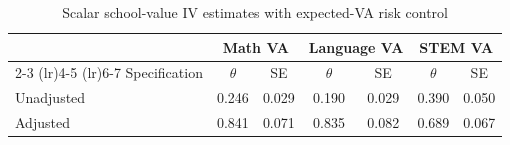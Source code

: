 \begin{table}[!htbp]
\centering
\caption{Scalar school-value IV estimates with expected-VA risk control}
\label{tab:scalar_school_value_iv_expected_va}
\begin{tabular}{lcccccc}
\toprule
 & \multicolumn{2}{c}{Math VA} & \multicolumn{2}{c}{Language VA} & \multicolumn{2}{c}{STEM VA} \\
\cmidrule(lr){2-3} \cmidrule(lr){4-5} \cmidrule(lr){6-7}
Specification & $\theta$ & SE & $\theta$ & SE & $\theta$ & SE \\
\midrule
Unadjusted & 0.246 & 0.029 & 0.190 & 0.029 & 0.390 & 0.050 \\
Adjusted & 0.841 & 0.071 & 0.835 & 0.082 & 0.689 & 0.067 \\
\bottomrule
\end{tabular}
\end{table}
